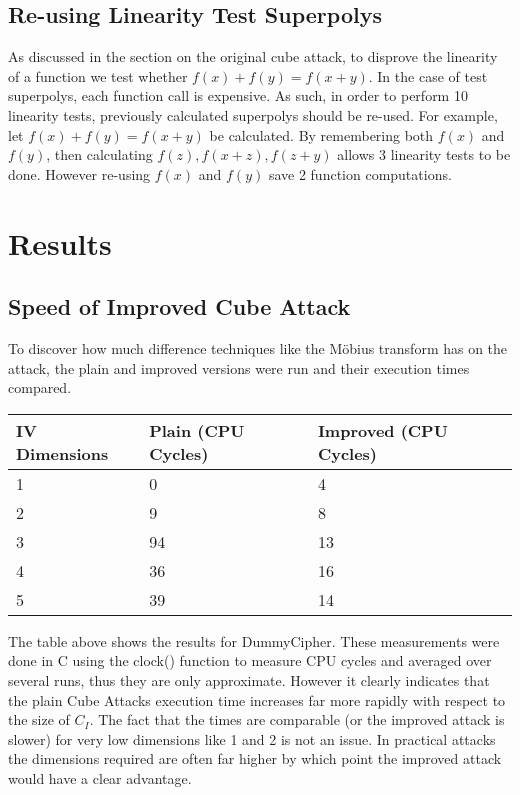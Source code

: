 \documentclass{report}
\let\Oldsection\section
\renewcommand{\section}{\FloatBarrier\Oldsection}
\let\Oldsubsection\subsection
\renewcommand{\subsection}{\FloatBarrier\Oldsubsection}
\begin{document}
\subsection{Re-using Linearity Test Superpolys}
As discussed in the section on the original cube attack, to disprove the linearity of a function we test whether $f(x)+f(y)=f(x+y)$. In the case of test superpolys, each function call is expensive. As such, in order to perform 10 linearity tests, previously calculated superpolys should be re-used. For example, let $f(x)+f(y)=f(x+y)$ be calculated. By remembering both $f(x)$ and $f(y)$, then calculating $f(z), f(x+z), f(z+y)$ allows 3 linearity tests to be done. However re-using $f(x)$ and $f(y)$ save 2 function computations. 
\section{Results}
\subsection{Speed of Improved Cube Attack}
To discover how much difference techniques like the M\"{o}bius transform has on the attack, the plain and improved versions were run and their execution times compared.
\begin{center}
    \begin{tabular}{| l | l | l |}
    \hline
    IV Dimensions & Plain (CPU Cycles) & Improved (CPU Cycles)\\ \hline
    1 & 0 & 4\\ \hline
    2 & 9 & 8\\ \hline
    3 & 94 & 13\\ \hline
    4 & 36 & 16\\ \hline
    5 & 39 & 14\\ \hline
    \end{tabular}
\end{center}
The table above shows the results for DummyCipher. These measurements were done in C using the clock() function to measure CPU cycles and averaged over several runs, thus they are only approximate. However it clearly indicates that the plain Cube Attacks execution time increases far more rapidly with respect to the size of $C_I$. The fact that the times are comparable (or the improved attack is slower) for very low dimensions like 1 and 2 is not an issue. In practical attacks the dimensions required are often far higher\cite{DinurShamir2009} by which point the improved attack would have a clear advantage. 
\end{document}
